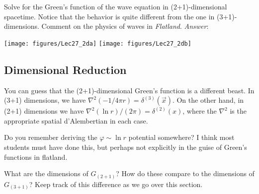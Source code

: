 \begin{exercise}
Solve for the Green's function of the wave equation in (2+1)-dimensional spacetime. Notice that the behavior is quite different from the one in (3+1)-dimensions. Comment on the physics of waves in \emph{Flatland}.
\emph{Answer}:
\begin{center}
\texttt{[image: figures/Lec27\_2da]}
\texttt{[image: figures/Lec27\_2db]}
\end{center}
\end{exercise}


\subsection{Dimensional Reduction}

You can guess that the (2+1)-dimensional Green's function is a different beast. In (3+1) dimensions, we have $\nabla^2 (-1/4\pi r) = \delta^{(3)}(\vec{x})$. On the other hand, in (2+1) dimensions we have $\nabla^2 (\ln r)/(2\pi) = \delta^{(2)}(x)$, where the $\nabla^2$ is the appropriate spatial d'Alembertian in each case.

\begin{exercise}
Do you remember deriving the $\varphi\sim \ln r$ potential somewhere? I think most students must have done this, but perhaps not explicitly in the guise of Green's functions in flatland.
\end{exercise}

\begin{exercise}
What are the dimensions of $G_{(2+1)}$? How do these compare to the dimensions of $G_{(3+1)}$? Keep track of this difference as we go over this section.
\end{exercise}

